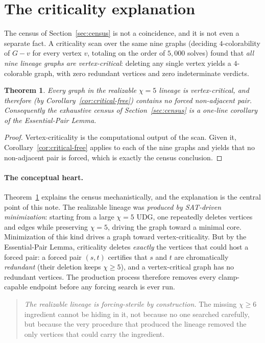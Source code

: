 \documentclass[11pt]{article}
\newtheorem{theorem}{Theorem}
\theoremstyle{definition}
\newcommand{\chrom}{\chi}
\begin{document}
\section{The criticality explanation}
\label{sec:criticality}

The census of Section~\ref{sec:census} is not a coincidence, and it is not even
a separate fact. A criticality scan over the same nine graphs (deciding
$4$-colorability of $G - v$ for every vertex $v$, totaling on the order of
$5{,}000$ solves) found that \emph{all nine lineage graphs are vertex-critical}:
deleting any single vertex yields a $4$-colorable graph, with zero redundant
vertices and zero indeterminate verdicts.

\begin{theorem}
\label{thm:sterile}
Every graph in the realizable $\chrom = 5$ lineage is vertex-critical, and
therefore (by Corollary~\ref{cor:critical-free}) contains no forced non-adjacent
pair. Consequently the exhaustive census of Section~\ref{sec:census} is a
one-line corollary of the Essential-Pair Lemma.
\end{theorem}

\begin{proof}
Vertex-criticality is the computational output of the scan. Given it,
Corollary~\ref{cor:critical-free} applies to each of the nine graphs and yields
that no non-adjacent pair is forced, which is exactly the census conclusion.
\end{proof}

\paragraph{The conceptual heart.} Theorem~\ref{thm:sterile} explains the census
mechanistically, and the explanation is the central point of this note. The
realizable lineage was \emph{produced by SAT-driven minimization}: starting from
a large $\chrom = 5$ UDG, one repeatedly deletes vertices and edges while
preserving $\chrom = 5$, driving the graph toward a minimal core. Minimization of
this kind drives a graph toward vertex-criticality. But by the Essential-Pair
Lemma, criticality deletes \emph{exactly} the vertices that could host a forced
pair: a forced pair $(s,t)$ certifies that $s$ and $t$ are chromatically
\emph{redundant} (their deletion keeps $\chrom \ge 5$), and a vertex-critical
graph has no redundant vertices. The production process therefore removes every
clamp-capable endpoint before any forcing search is ever run.

\begin{quote}
\emph{The realizable lineage is forcing-sterile by construction.} The missing
$\chrom \ge 6$ ingredient cannot be hiding in it, not because no one searched
carefully, but because the very procedure that produced the lineage removed the
only vertices that could carry the ingredient.
\end{quote}
\end{document}
